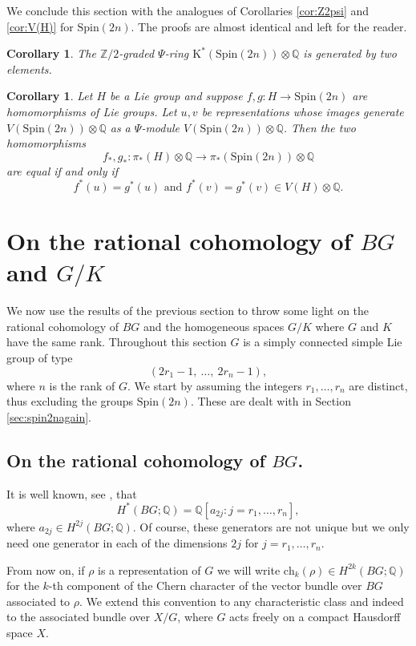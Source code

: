 \documentclass[twoside,a4paper,reqno,11pt]{amsart}
\newtheorem{corollary}[lemma]{Corollary}
\newcommand{\K}{\mathrm{K}}
\newcommand{\Q}{\mathbb{Q}}
\newcommand{\Z}{\mathbb{Z}}
\renewcommand{\o}{\otimes}
\newcommand{\Spin}{\mathrm{Spin}}
\newcommand{\ch}{\mathrm{ch}}
\begin{document}
We conclude this section with the analogues of Corollaries \ref{cor:Z2psi} and \ref{cor:V(H)} for $\Spin(2n)$. The proofs are almost identical and left for the reader. 

\begin{corollary}
The $\Z/2$-graded $\Psi$-ring $\K^*(\Spin(2n)) \o\Q$ is generated by two elements.
\end{corollary}


\begin{corollary} \label{cor:V(H)spin}
Let $H$ be a Lie group and suppose $f, g : H \to \Spin(2n)$ are homomorphisms of Lie groups.  Let $u, v$ be representations whose images generate $V(\Spin(2n))\o \Q$ as a $\Psi$-module $V(\Spin(2n))\o\Q$. Then the two homomorphisms
$$
f_*, g_* : \pi_*(H)\o \Q \to \pi_*(\Spin(2n))\o \Q
$$
are equal if and only if 
$$
f^*(u) = g^*(u) \text{ and } f^*(v) = g^*(v) \in V(H) \o \Q. 
$$
\end{corollary} 




\section{On the rational cohomology of $BG$ and $G/K$} \label{sec:ratcoho}
We now use the results of the previous section to throw some light on the rational cohomology of $BG$ and the homogeneous spaces $G/K$ where $G$ and $K$ have the same rank. Throughout this section $G$ is a simply connected simple Lie group of type
$$
(2r_1-1, \ \ldots, \ 2r_n -1), 
$$
where $n$ is the rank of $G$. We start by assuming the integers $r_1, \ldots, r_n$ are distinct, thus excluding the groups $\Spin(2n)$. These are dealt with in Section \ref{sec:spin2nagain}. 

\subsection{On the rational cohomology of $BG$.}
 It is well known, see \cite[Th\'eor\`eme~19.1]{MR0051508}, that \[ H^*(BG; \Q) = \Q [a_{2j} : j = r_1, \dots, r_n], \]
where $a_{2j} \in H^{2j}(BG; \Q)$.  Of course, these generators are not unique but we only need one generator in each of the dimensions $2j$ for $j = r_1, \dots, r_n$.

From now on, if $\rho$ is a representation of $G$ we will write $\ch_k(\rho) \in H^{2k}(BG; \Q)$ for the $k$-th component of the Chern character of the vector bundle over $BG$ associated to $\rho$.  We extend this convention to any characteristic class and indeed to the associated bundle over $X/G$, where $G$ acts freely on a compact Hausdorff space $X$.
\end{document}
